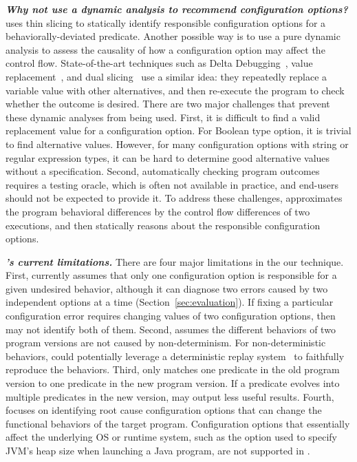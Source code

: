 \vspace{1mm}
\noindent \textbf{\textit{Why not use a dynamic analysis to recommend
configuration options?}}
\ourtool uses thin slicing to statically identify responsible configuration
options for a behaviorally-deviated predicate. Another possible way is to use a pure
dynamic analysis to assess the causality of how a configuration option
may affect the control flow. State-of-the-art
techniques such as Delta Debugging~\cite{dd}, value replacement~\cite{failuredoc},
and dual slicing~\cite{Sumner:2013:CCE}
use a similar idea: they repeatedly replace a variable value with other alternatives,
and then re-execute the program to check whether the outcome is desired.
There are two major challenges that prevent these dynamic analyses
from being used. First, it is
difficult to find a valid replacement value for a configuration option.
For Boolean type option, it is trivial to find alternative values.
However, for many configuration options with string or regular expression types, it
can be hard to determine good alternative values without a specification.
Second, automatically checking program outcomes requires
a testing oracle, which is often not available in practice, and end-users
should not be  expected to provide it. To address these challenges,
\ourtool approximates the program behavioral differences by the
control flow differences of two executions, and then statically reasons
about the responsible configuration options.



\vspace{1mm}
\noindent \textbf{\textit{\ourtool's current limitations.}}
There are four major limitations in the our \ourtool technique.
First, \ourtool currently assumes that only one
configuration option is responsible for a given undesired behavior,
although it can diagnose two errors caused by two independent options
at a time (Section~\ref{sec:evaluation}).
If fixing a particular configuration error
requires changing values of two configuration options,
then \ourtool may not identify both of them.
Second, \ourtool assumes the different behaviors
of two program versions are not caused by non-determinism.
For non-deterministic behaviors, \ourtool
could potentially leverage a deterministic replay
system~\cite{Huang:2013:CRL, Jin:2012:BRF} to faithfully reproduce the behaviors.
Third, \ourtool only matches one predicate in the old
program version to one predicate in the new program version.
If a predicate evolves into multiple predicates in the new
version, \ourtool may output less useful results. 
Fourth, \ourtool focuses on identifying root cause
configuration options that can change the functional behaviors of
the target program.
Configuration options that essentially affect the underlying
OS or runtime system, such as the  option used to
specify JVM's heap size when launching a Java program,
are not supported in \ourtool.

